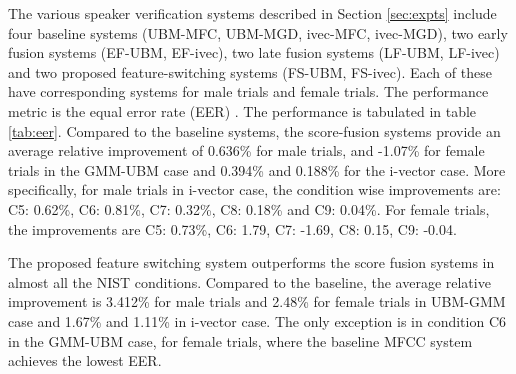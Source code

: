 \documentclass{article}
\begin{document}
The various speaker verification systems described in Section \ref{sec:expts} 
include four baseline systems (UBM-MFC, UBM-MGD, ivec-MFC, ivec-MGD), two early
fusion systems (EF-UBM, EF-ivec), two late fusion systems (LF-UBM, LF-ivec) 
and two proposed feature-switching systems (FS-UBM, FS-ivec). Each of these have 
corresponding systems for male trials and female trials. The performance metric 
is the equal error rate (EER) \cite{eer1}. The performance is tabulated in table \ref{tab:eer}.
Compared to the baseline systems, the score-fusion systems provide an average
relative improvement of 0.636\% for male trials, and -1.07\% for female trials in the
GMM-UBM case and 0.394\% and 0.188\% for the i-vector case. 
More specifically, for male trials in i-vector case, the
condition wise improvements are: C5: 0.62\%, C6: 0.81\%, C7: 0.32\%, C8: 0.18\% and C9: 0.04\%. For
female trials, the improvements are C5: 0.73\%, C6: 1.79, C7: -1.69, C8: 0.15, C9: -0.04.



The proposed feature switching system outperforms the score fusion systems in
almost all the NIST conditions. Compared to the baseline, the average relative
improvement is 3.412\% for male trials and 2.48\% for female trials in UBM-GMM case and 1.67\% and 1.11\% in 
i-vector case. The only exception is in condition C6 
in the GMM-UBM case, for female trials, where the baseline
MFCC system achieves the lowest EER.
\end{document}

